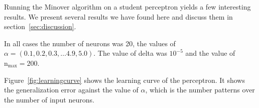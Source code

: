 Running the Minover algorithm on a student perceptron yields a few interesting results.
We present several results we have found here and discuss them in section~\ref{sec:discussion}. 

In all cases the number of neurons was 20, the values of \(\alpha = (0.1, 0.2, 0.3, \ldots 4.9, 5.0)\).
The value of delta was \(10^{-5}\) and the value of \(\text{n}_{\text{max}} = 200\).


Figure~\ref{fig:learningcurve} shows the learning curve of the perceptron.
It shows the generalization error against the value of \(\alpha\), which is the number patterns over the number of input neurons. 


